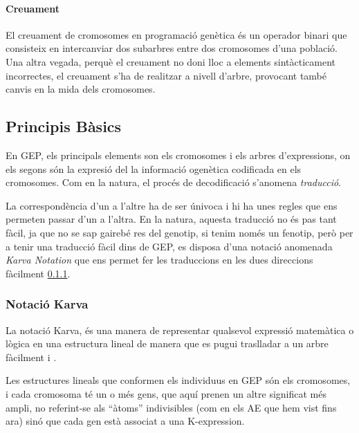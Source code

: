 \documentclass[titlepage,a4paper,12pt]{book}
\begin{document}
\paragraph{Creuament} %
\label{par:Creuament}
El creuament de cromosomes en programació genètica és un operador binari que
consisteix en intercanviar dos subarbres entre dos cromosomes d'una població.
Una altra vegada, perquè el creuament no doni lloc a elements sintàcticament
incorrectes, el creuament s'ha de realitzar a nivell d'arbre, provocant també
canvis en la mida dels cromosomes.



\subsection{Principis Bàsics} %
\label{sub:Principis Basics}

En GEP, els principals elements son els cromosomes i els arbres d'expressions,
on els segons són la expresió del la informació ogenètica codificada en els
cromosomes.  Com en la natura, el procés de decodificació s'anomena
\emph{traducció}.

La correspondència d'un a l'altre ha de ser únivoca i hi ha unes regles que ens
permeten passar d'un a l'altra.  En la natura, aquesta traducció no és pas tant
fàcil, ja que no se sap gairebé res del genotip, si tenim només un fenotip, però
per a tenir una traducció fàcil dins de GEP, es disposa d'una notació anomenada
\emph{Karva Notation} que ens permet fer les traduccions en les dues direccions
fàcilment \ref{ssub:Notacio Karva}.



\subsubsection{Notació Karva} %
\label{ssub:Notacio Karva}

La notació Karva, és una manera de representar qualsevol expressió matemàtica o
lògica en una estructura lineal de manera que es pugui traslladar a un arbre
fàcilment \cite{ferreira:2001} i \cite{ferreira:2006}.

Les estructures lineals que conformen els individuus en GEP són els cromosomes,
i cada cromosoma té un o més gens, que aquí prenen un altre significat més
ampli, no referint-se als ``àtoms'' indivisibles (com en els AE que hem vist
fins ara) sinó que cada gen està associat a una K-expression.
\cite{ferreira:2007}
\end{document}
